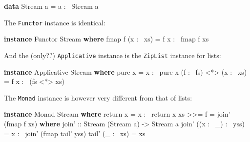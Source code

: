 \documentclass[]{article}
\newenvironment{Shaded}{}{}
\newcommand{\KeywordTok}[1]{\textcolor[rgb]{0.00,0.44,0.13}{\textbf{{#1}}}}
\newcommand{\DataTypeTok}[1]{\textcolor[rgb]{0.56,0.13,0.00}{{#1}}}
\newcommand{\OtherTok}[1]{\textcolor[rgb]{0.00,0.44,0.13}{{#1}}}
\newcommand{\FunctionTok}[1]{\textcolor[rgb]{0.02,0.16,0.49}{{#1}}}
\newcommand{\NormalTok}[1]{{#1}}
\begin{document}
\begin{Shaded}
\begin{Highlighting}[]
\KeywordTok{data} \DataTypeTok{Stream} \NormalTok{a }\FunctionTok{=} \NormalTok{a }\FunctionTok{:~} \DataTypeTok{Stream} \NormalTok{a}
\end{Highlighting}
\end{Shaded}

The \texttt{Functor} instance is identical:

\begin{Shaded}
\begin{Highlighting}[]
\KeywordTok{instance} \DataTypeTok{Functor} \DataTypeTok{Stream} \KeywordTok{where}
    \NormalTok{fmap f (x }\FunctionTok{:~} \NormalTok{xs) }\FunctionTok{=} \NormalTok{f x }\FunctionTok{:~} \NormalTok{fmap f xs}
\end{Highlighting}
\end{Shaded}

And the (only??) \texttt{Applicative} instance is the \texttt{ZipList}
instance for lists:

\begin{Shaded}
\begin{Highlighting}[]
\KeywordTok{instance} \DataTypeTok{Applicative} \DataTypeTok{Stream} \KeywordTok{where}
    \NormalTok{pure x }\FunctionTok{=} \NormalTok{x }\FunctionTok{:~} \NormalTok{pure x}
    \NormalTok{(f }\FunctionTok{:~} \NormalTok{fs) }\FunctionTok{<*>} \NormalTok{(x }\FunctionTok{:~} \NormalTok{xs) }\FunctionTok{=} \NormalTok{f x }\FunctionTok{:~} \NormalTok{(fs }\FunctionTok{<*>} \NormalTok{xs)}
\end{Highlighting}
\end{Shaded}

The \texttt{Monad} instance is however very different from that of
lists:

\begin{Shaded}
\begin{Highlighting}[]
\KeywordTok{instance} \DataTypeTok{Monad} \DataTypeTok{Stream} \KeywordTok{where}
    \NormalTok{return x }\FunctionTok{=} \NormalTok{x }\FunctionTok{:~} \NormalTok{return x}
    \NormalTok{xs }\FunctionTok{>>=} \NormalTok{f }\FunctionTok{=} \NormalTok{join' (fmap f xs)}
      \KeywordTok{where}
\OtherTok{        join' ::} \DataTypeTok{Stream} \NormalTok{(}\DataTypeTok{Stream} \NormalTok{a) }\OtherTok{->} \DataTypeTok{Stream} \NormalTok{a}
        \NormalTok{join' ((x }\FunctionTok{:~} \NormalTok{_) }\FunctionTok{:~} \NormalTok{yss) }\FunctionTok{=} \NormalTok{x }\FunctionTok{:~} \NormalTok{join' (fmap tail' yss)}
        \NormalTok{tail' (_ }\FunctionTok{:~} \NormalTok{xs) }\FunctionTok{=} \NormalTok{xs}
\end{Highlighting}
\end{Shaded}
\end{document}
